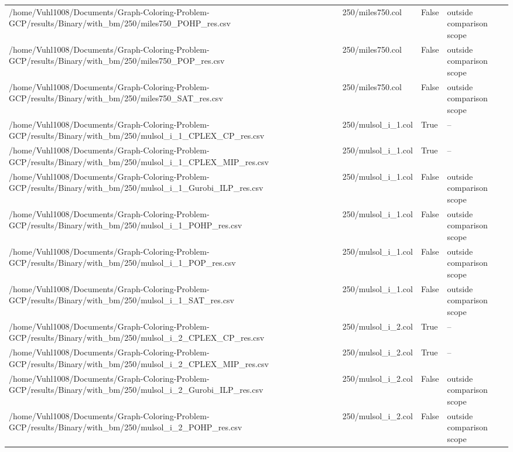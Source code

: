 \begin{table}[htbp]
\begin{tabular}{llll}
/home/Vuhl1008/Documents/Graph-Coloring-Problem-GCP/results/Binary/with\_bm/250/miles750\_POHP\_res.csv & 250/miles750.col & False & outside comparison scope \\
/home/Vuhl1008/Documents/Graph-Coloring-Problem-GCP/results/Binary/with\_bm/250/miles750\_POP\_res.csv & 250/miles750.col & False & outside comparison scope \\
/home/Vuhl1008/Documents/Graph-Coloring-Problem-GCP/results/Binary/with\_bm/250/miles750\_SAT\_res.csv & 250/miles750.col & False & outside comparison scope \\
/home/Vuhl1008/Documents/Graph-Coloring-Problem-GCP/results/Binary/with\_bm/250/mulsol\_i\_1\_CPLEX\_CP\_res.csv & 250/mulsol\_i\_1.col & True & -- \\
/home/Vuhl1008/Documents/Graph-Coloring-Problem-GCP/results/Binary/with\_bm/250/mulsol\_i\_1\_CPLEX\_MIP\_res.csv & 250/mulsol\_i\_1.col & True & -- \\
/home/Vuhl1008/Documents/Graph-Coloring-Problem-GCP/results/Binary/with\_bm/250/mulsol\_i\_1\_Gurobi\_ILP\_res.csv & 250/mulsol\_i\_1.col & False & outside comparison scope \\
/home/Vuhl1008/Documents/Graph-Coloring-Problem-GCP/results/Binary/with\_bm/250/mulsol\_i\_1\_POHP\_res.csv & 250/mulsol\_i\_1.col & False & outside comparison scope \\
/home/Vuhl1008/Documents/Graph-Coloring-Problem-GCP/results/Binary/with\_bm/250/mulsol\_i\_1\_POP\_res.csv & 250/mulsol\_i\_1.col & False & outside comparison scope \\
/home/Vuhl1008/Documents/Graph-Coloring-Problem-GCP/results/Binary/with\_bm/250/mulsol\_i\_1\_SAT\_res.csv & 250/mulsol\_i\_1.col & False & outside comparison scope \\
/home/Vuhl1008/Documents/Graph-Coloring-Problem-GCP/results/Binary/with\_bm/250/mulsol\_i\_2\_CPLEX\_CP\_res.csv & 250/mulsol\_i\_2.col & True & -- \\
/home/Vuhl1008/Documents/Graph-Coloring-Problem-GCP/results/Binary/with\_bm/250/mulsol\_i\_2\_CPLEX\_MIP\_res.csv & 250/mulsol\_i\_2.col & True & -- \\
/home/Vuhl1008/Documents/Graph-Coloring-Problem-GCP/results/Binary/with\_bm/250/mulsol\_i\_2\_Gurobi\_ILP\_res.csv & 250/mulsol\_i\_2.col & False & outside comparison scope \\
/home/Vuhl1008/Documents/Graph-Coloring-Problem-GCP/results/Binary/with\_bm/250/mulsol\_i\_2\_POHP\_res.csv & 250/mulsol\_i\_2.col & False & outside comparison scope \\

\end{tabular}
\end{table}
